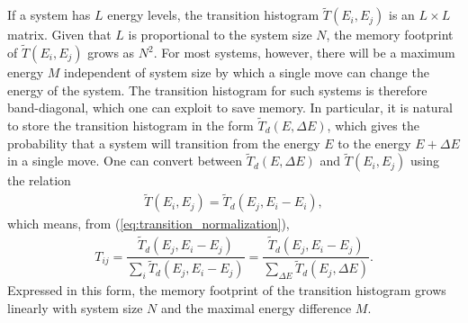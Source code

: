 \documentclass[11pt]{article}
\newcommand{\f}[2]{\dfrac{#1}{#2}} %
\newcommand{\p}[1]{\left(#1\right)} %
\begin{document}
If a system has $L$ energy levels, the transition histogram $\tilde
T\p{E_i,E_j}$ is an $L\times L$ matrix. Given that $L$ is proportional
to the system size $N$, the memory footprint of $\tilde T\p{E_i,E_j}$
grows as $N^2$. For most systems, however, there will be a maximum
energy $M$ independent of system size by which a single move can
change the energy of the system. The transition histogram for such
systems is therefore band-diagonal, which one can exploit to save
memory. In particular, it is natural to store the transition histogram
in the form $\tilde T_d\p{E,\Delta E}$, which gives the probability
that a system will transition from the energy $E$ to the energy
$E+\Delta E$ in a single move. One can convert between $\tilde
T_d\p{E,\Delta E}$ and $\tilde T\p{E_i,E_j}$ using the relation
\begin{align}
  \tilde T\p{E_i,E_j}=\tilde T_d\p{E_j,E_i-E_i},
\end{align}
which means, from (\ref{eq:transition_normalization}),
\begin{align}
  T_{ij}=\f{\tilde T_d\p{E_j,E_i-E_j}}{\sum_i\tilde
    T_d\p{E_j,E_i-E_j}} =\f{\tilde T_d\p{E_j,E_i-E_j}} {\sum_{\Delta
      E}\tilde T_d\p{E_j,\Delta E}}.
  \label{eq:transition_conversion}
\end{align}
Expressed in this form, the memory footprint of the transition
histogram grows linearly with system size $N$ and the maximal energy
difference $M$.
\end{document}
